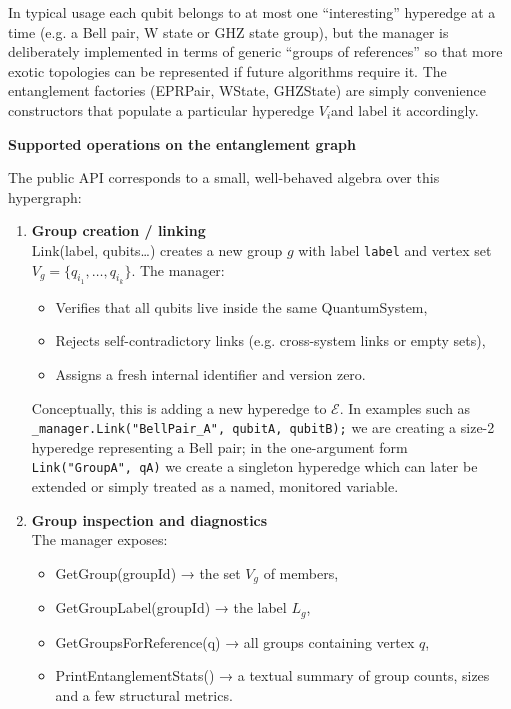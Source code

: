 \documentclass[a4paper,11pt]{article}
\begin{document}
In typical usage each qubit belongs to at most one ``interesting'' hyperedge at a time (e.g. a Bell pair, W state or GHZ state group), but the manager is deliberately implemented in terms of generic ``groups of references'' so that more exotic topologies can be represented if future algorithms require it. The entanglement factories (EPRPair, WState, GHZState) are simply convenience constructors that populate a particular hyperedge \(V_{i}\)and label it accordingly.

\textbf{Supported operations on the entanglement graph}

The public API corresponds to a small, well-behaved algebra over this hypergraph:

\begin{enumerate}
\def\labelenumi{\arabic{enumi}.}
\item
  \textbf{Group creation / linking}\\
  Link(label, qubits\ldots) creates a new group \(g\) with label \texttt{label} and vertex set \(V_{g} = \{ q_{i_{1}},\ldots,q_{i_{k}}\}\). The manager:

  \begin{itemize}
  \item Verifies that all qubits live inside the same QuantumSystem,
  \item Rejects self-contradictory links (e.g. cross-system links or empty sets),
  \item Assigns a fresh internal identifier and version zero.
  \end{itemize}

  Conceptually, this is adding a new hyperedge to \(\mathcal{E}\). In examples such as
  \texttt{\_manager.Link("BellPair\_A", qubitA, qubitB);}
  we are creating a size-2 hyperedge representing a Bell pair; in the one-argument form
  \texttt{Link("GroupA", qA)} we create a singleton hyperedge which can later be extended or
  simply treated as a named, monitored variable.

\item
  \textbf{Group inspection and diagnostics}\\
  The manager exposes:

  \begin{itemize}
  \item GetGroup(groupId) → the set \(V_{g}\) of members,
  \item GetGroupLabel(groupId) → the label \(L_{g}\),
  \item GetGroupsForReference(q) → all groups containing vertex \(q\),
  \item PrintEntanglementStats() → a textual summary of group counts, sizes and a few structural metrics.
  \end{itemize}


\end{enumerate}
\end{document}
